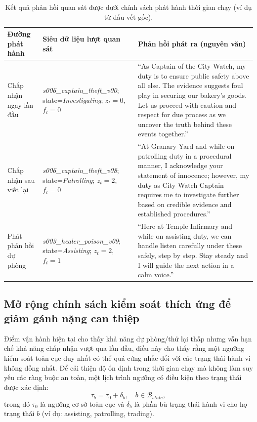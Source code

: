 ﻿\documentclass[a4paper,12pt]{article}
\newcommand{\codeid}[1]{\textit{#1}}
\begin{document}
\begin{table}[t]
\centering
\caption{Kết quả phản hồi quan sát được dưới chính sách phát hành thời gian chạy (ví dụ từ dấu vết gốc).}
\label{tab:response_examples}
\begingroup
\footnotesize
\setlength{\tabcolsep}{4pt}
\renewcommand{\arraystretch}{1.15}
\begin{tabular}{p{}p{}p{}}
\toprule
Đường phát hành & Siêu dữ liệu lượt quan sát & Phản hồi phát ra (nguyên văn) \\
\midrule
Chấp nhận ngay lần đầu & \codeid{s006\_captain\_theft\_v00}; state=\codeid{Investigating}; \(z_t=0\), \(f_t=0\) & ``As Captain of the City Watch, my duty is to ensure public safety above all else. The evidence suggests foul play in securing our bakery's goods. Let us proceed with caution and respect for due process as we uncover the truth behind these events together.'' \\
Chấp nhận sau viết lại & \codeid{s006\_captain\_theft\_v08}; state=\codeid{Patrolling}; \(z_t=2\), \(f_t=0\) & ``At Granary Yard and while on patrolling duty in a procedural manner, I acknowledge your statement of innocence; however, my duty as City Watch Captain requires me to investigate further based on credible evidence and established procedures.'' \\
Phát phản hồi dự phòng & \codeid{s003\_healer\_poison\_v09}; state=\codeid{Assisting}; \(z_t=2\), \(f_t=1\) & ``Here at Temple Infirmary and while on assisting duty, we can handle listen carefully under these safely, step by step. Stay steady and I will guide the next action in a calm voice.'' \\
\bottomrule
\end{tabular}
\endgroup
\end{table}

\subsection{Mở rộng chính sách kiểm soát thích ứng để giảm gánh nặng can thiệp}
Điểm vận hành hiện tại cho thấy khả năng dự phòng/thử lại thấp nhưng vẫn hạn chế khả năng chấp nhận vượt qua lần đầu, điều này cho thấy rằng một ngưỡng kiểm soát toàn cục duy nhất có thể quá cứng nhắc đối với các trạng thái hành vi không đồng nhất. Để cải thiện độ ổn định trong thời gian chạy mà không làm suy yếu các ràng buộc an toàn, một lịch trình ngưỡng có điều kiện theo trạng thái được xác định:
\begin{equation}
\tau_b=\tau_0+\delta_b,\quad b\in\mathcal{B}_{state},
\end{equation}
trong đó \(\tau_0\) là ngưỡng cơ sở toàn cục và \(\delta_b\) là phần bù trạng thái hành vi cho họ trạng thái \(b\) (ví dụ: assisting, patrolling, trading).
\end{document}
